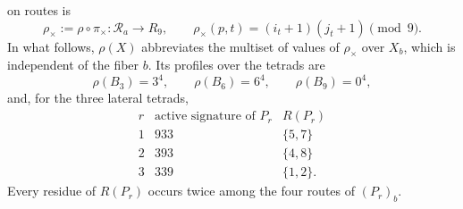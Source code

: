 on routes is
\begin{equation}
 \rho_\times:=\rho\circ\pi_\times:\mathcal R_a\longrightarrow R_9,
 \qquad
 \rho_\times(p,t)=(i_t+1)(j_t+1)\pmod9.
 \label{eq:residuo-producto-rutas-fano-semillas-rev3}
\end{equation}
In what follows, \(\rho(X)\) abbreviates the multiset of values of
\(\rho_\times\) over \(X_b\), which is independent of the fiber \(b\). Its
profiles over the tetrads are
\[
 \rho(B_3)=3^4,
 \qquad
 \rho(B_6)=6^4,
 \qquad
 \rho(B_9)=0^4,
\]
and, for the three lateral tetrads,
\begin{equation}
 \begin{array}{c|c|c}
 r&\text{active signature of }P_r&R(P_r)\\
 \hline
 1&933&\{5,7\}\\
 2&393&\{4,8\}\\
 3&339&\{1,2\}.
 \end{array}
 \label{eq:perfiles-laterales-fano-semillas-rev3}
\end{equation}
Every residue of \(R(P_r)\) occurs twice among the four routes of
\((P_r)_b\).

